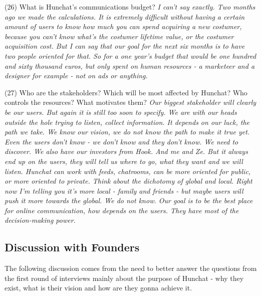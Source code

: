 \documentclass[12pt]{article}
\begin{document}
(26) What is Hunchat’s communications budget? \textit{I can't say exactly. Two months ago we made the calculations. It is extremely difficult without having a certain amount of users to know how much you can spend acquiring a new costumer, because you can't know what's the costumer lifetime value, or the costumer acquisition cost. But I can say that our goal for the next six months is to have two people oriented for that. So for a one year's budget that would be one hundred and sixty thousand euros, but only spent on human resources - a marketeer and a designer for example - not on ads or anything.}

(27) Who are the stakeholders? Which will be most affected by Hunchat? Who controls the resources? What motivates them? \textit{Our biggest stakeholder will clearly be our users. But again it is still too soon to specify. We are with our heads outside the hole trying to listen, collect information. It depends on our luck, the path we take. We know our vision, we do not know the path to make it true yet. Even the users don't know - we don't know and they don't know. We need to discover. We also have our investors from Hook. And me and Ze. But it always end up on the users, they will tell us where to go, what they want and we will listen. Hunchat can work with feeds, chatrooms, can be more oriented for public, or more oriented to private. Think about the dichotomy of global and local. Right now I'm telling you it's more local - family and friends - but maybe users will push it more towards the global. We do not know. Our goal is to be the best place for online communication, how depends on the users. They have most of the decision-making power.}

\subsection {Discussion with Founders}

The following discussion comes from the need to better answer the questions from the first round of interviews mainly about the purpose of Hunchat - why they exist, what is their vision and how are they gonna achieve it. 
\end{document}
